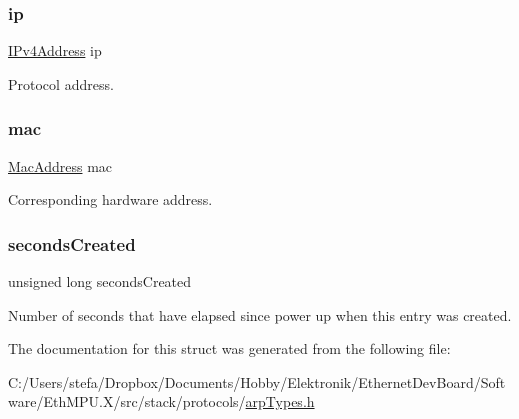 \subsubsection{\texorpdfstring{ip}{ip}}
{\footnotesize\ttfamily \mbox{\hyperlink{group__ipv4_gac3530474aec32033cd4709abdc7bded7}{I\+Pv4\+Address}} ip}



Protocol address. 

\mbox{\label{struct_a_r_p_table_entry___a2d3bb97c3d100ba11c2257680d849879}} 
\subsubsection{\texorpdfstring{mac}{mac}}
{\footnotesize\ttfamily \mbox{\hyperlink{ethernet_types_8h_a7fed77396097fa92ca5f4b185844244c}{Mac\+Address}} mac}



Corresponding hardware address. 

\mbox{\label{struct_a_r_p_table_entry___ad6156a16b2f445f0640d7a6e5d65c98a}} 
\subsubsection{\texorpdfstring{secondsCreated}{secondsCreated}}
{\footnotesize\ttfamily unsigned long seconds\+Created}



Number of seconds that have elapsed since power up when this entry was created. 



The documentation for this struct was generated from the following file\+:\begin{DoxyCompactItemize}
\item 
C\+:/\+Users/stefa/\+Dropbox/\+Documents/\+Hobby/\+Elektronik/\+Ethernet\+Dev\+Board/\+Software/\+Eth\+M\+P\+U.\+X/src/stack/protocols/\mbox{\hyperlink{arp_types_8h}{arp\+Types.\+h}}\end{DoxyCompactItemize}
